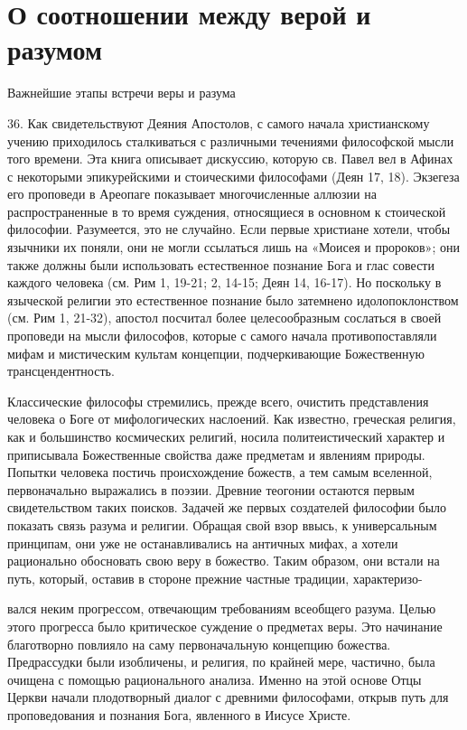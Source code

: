 \documentclass[a5paper,10pt]{article}
\begin{document}
\section{О соотношении между верой и разумом}

Важнейшие этапы встречи веры и разума

36. Как свидетельствуют Деяния Апостолов, с самого начала христианскому учению
приходилось сталкиваться с различными течениями философской мысли того времени.
Эта книга описывает дискуссию, которую св. Павел вел в Афинах с некоторыми
эпикурейскими и стоическими философами (Деян 17, 18). Экзегеза его проповеди в
Ареопаге показывает многочисленные аллюзии на распространенные в то время
суждения, относящиеся в основном к стоической философии. Разумеется, это не
случайно. Если первые христиане хотели, чтобы язычники их поняли, они не могли
ссылаться лишь на «Моисея и пророков»; они также должны были использовать
естественное познание Бога и глас совести каждого человека (см. Рим 1, 19-21;
2, 14-15; Деян 14, 16-17). Но поскольку в языческой религии это естественное
познание было затемнено идолопоклонством (см. Рим 1, 21-32), апостол посчитал
более целесообразным сослаться в своей проповеди на мысли философов, которые с
самого начала противопоставляли мифам и мистическим культам концепции,
подчеркивающие Божественную трансцендентность.

Классические философы стремились, прежде всего, очистить представления человека
о Боге от мифологических наслоений. Как известно, греческая религия, как и
большинство космических религий, носила политеистический характер и приписывала
Божественные свойства даже предметам и явлениям природы. Попытки человека
постичь происхождение божеств, а тем самым вселенной, первоначально выражались
в поэзии. Древние теогонии остаются первым свидетельством таких поисков.
Задачей же первых создателей философии было показать связь разума и религии.
Обращая свой взор ввысь, к универсальным принципам, они уже не останавливались
на античных мифах, а хотели рационально обосновать свою веру в божество. Таким
образом, они встали на путь, который, оставив в стороне прежние частные
традиции, характеризо-

вался неким прогрессом, отвечающим требованиям всеобщего разума. Целью этого
прогресса было критическое суждение о предметах веры. Это начинание благотворно
повлияло на саму первоначальную концепцию божества. Предрассудки были
изобличены, и религия, по крайней мере, частично, была очищена с помощью
рационального анализа. Именно на этой основе Отцы Церкви начали плодотворный
диалог с древними философами, открыв путь для проповедования и познания Бога,
явленного в Иисусе Христе.
\end{document}
